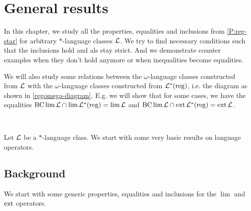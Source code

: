 \section{General results}
\label{general-results}

In this chapter, we study all the properties, equalities and inclusions from \cref{P:reg-star} for arbitrary $*$-language classes $\mathcal{L}$. We try to find necessary conditions such that the inclusions hold and als stay strict. And we demonstrate counter examples when they don't hold anymore or when inequalities become equalities.

We will also study some relations between the $\omega$-language classes constructed from $\mathcal{L}$ with the $\omega$-language classes constructed from $\mathcal{L}^*(\textup{\textrm{reg}})$, i.e. the diagram as shown in \cref{regomega-diagram}. E.g. we will show that for some cases, we have the equalities $\operatorname{BC} \lim \mathcal{L} \cap \lim \mathcal{L}^*(\textup{\textrm{reg}}) = \lim \mathcal{L}$ and $\operatorname{BC} \lim \mathcal{L} \cap \operatorname{ext} \mathcal{L}^*(\textup{\textrm{reg}}) = \operatorname{ext} \mathcal{L}$.


\

Let $\mathcal{L}$ be a $*$-language class. We start with some very basic results on language operators.

\subsection{Background}
We start with some generic properties, equalities and inclusions for the $\lim$ and $\operatorname{ext}$ operators.

